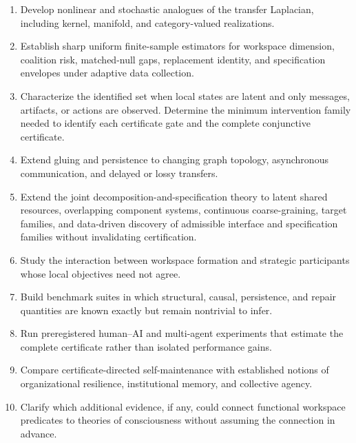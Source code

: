 \begin{enumerate}
\item Develop nonlinear and stochastic analogues of the transfer Laplacian, including kernel, manifold,
and category-valued realizations.

\item Establish sharp uniform finite-sample estimators for workspace dimension, coalition risk,
matched-null gaps, replacement identity, and specification envelopes under adaptive data collection.

\item Characterize the identified set when local states are latent and only messages, artifacts, or
actions are observed. Determine the minimum intervention family needed to identify each certificate gate
and the complete conjunctive certificate.

\item Extend gluing and persistence to changing graph topology, asynchronous communication, and
delayed or lossy transfers.

\item Extend the joint decomposition-and-specification theory to latent shared resources, overlapping
component systems, continuous coarse-graining, target families, and data-driven discovery of admissible
interface and specification families without invalidating certification.

\item Study the interaction between workspace formation and strategic participants whose local objectives
need not agree.

\item Build benchmark suites in which structural, causal, persistence, and repair quantities are known
exactly but remain nontrivial to infer.

\item Run preregistered human--AI and multi-agent experiments that estimate the complete certificate
rather than isolated performance gains.

\item Compare certificate-directed self-maintenance with established notions of organizational resilience,
institutional memory, and collective agency.

\item Clarify which additional evidence, if any, could connect functional workspace predicates to theories
of consciousness without assuming the connection in advance.
\end{enumerate}

